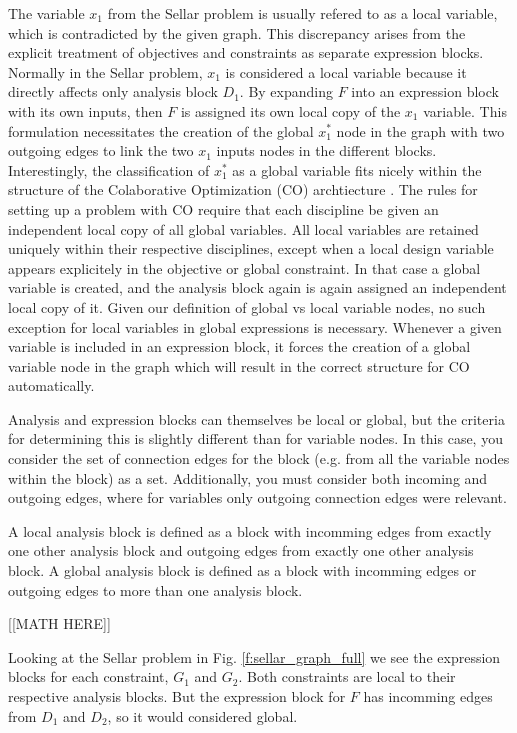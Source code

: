   The variable $x_1$ from the Sellar problem is usually refered to as 
  a local variable, which is contradicted by the given graph. This discrepancy 
  arises from the explicit treatment of objectives and constraints as separate 
  expression blocks. Normally in the Sellar problem, $x_1$ is considered a local 
  variable because it directly affects only analysis block $D_1$. By expanding
  $F$ into an expression block with its own inputs, then $F$ is assigned its own local 
  copy of the $x_1$ variable. This formulation necessitates the creation of the global $x_1^*$ 
  node in the graph with two outgoing edges to link the two $x_1$ inputs nodes 
  in the different blocks. Interestingly, the classification of $x_1^*$ 
  as a global variable fits nicely within the structure of the Colaborative 
  Optimization (CO) archtiecture \cite{braun1996thesis}. The rules for setting up 
  a problem with CO require that each discipline be given an independent local 
  copy of all global variables. All local variables are retained uniquely 
  within their respective disciplines, except when a local design variable appears 
  explicitely in the objective or global constraint. In that case a global 
  variable is created, and the analysis block again is again assigned an 
  independent local copy of it. Given our definition of global vs local variable 
  nodes, no such exception for local variables in global expressions is 
  necessary. Whenever a given variable is included in an expression block, 
  it forces the creation of a global variable node in the graph which will 
  result in the correct structure for CO automatically. 

  Analysis and expression blocks can themselves be local or global, but the 
  criteria for determining this is slightly different than for variable nodes. 
  In this case, you consider the set of connection edges for the block
  (e.g. from all the variable nodes within the block) as a set. Additionally, 
  you must consider both incoming and outgoing edges, where for variables 
  only outgoing connection edges were relevant. 

  A local analysis block is 
  defined as a block with incomming edges from exactly one other analysis 
  block and outgoing edges from exactly one other analysis block. A global 
  analysis block is defined as a block with incomming edges or outgoing edges 
  to more than one analysis block. 

  [[MATH HERE]]

  Looking at the Sellar problem in 
  Fig. \ref{f:sellar_graph_full} we see the expression blocks for each constraint, 
  $G_1$ and $G_2$. Both constraints are local to their respective analysis 
  blocks. But the expression block for $F$ has incomming edges from $D_1$ and 
  $D_2$, so it would considered global. 

